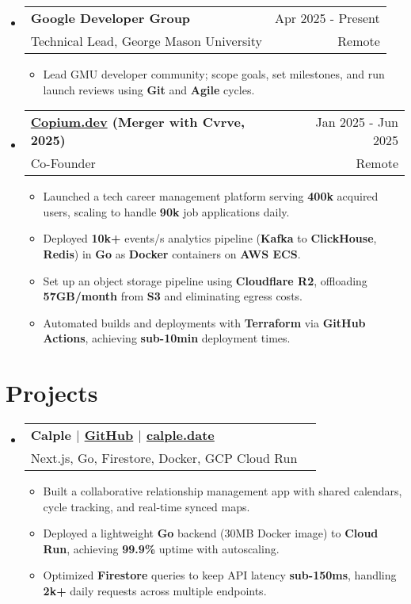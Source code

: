 \documentclass[letterpaper,11pt]{article}
\makeatletter
\newcommand{\resumeItem}[1]{
  \item{
    {#1}
  }
}
\newcommand{\resumeSubheading}[4]{
    \item
    \begin{tabular*}{0.985\textwidth}[t]{l@{\extracolsep{\fill}}r@{\hspace{-0.1in}}}
        {\textbf{#1}} & {#2} \\
        #3 &  #4 \\
    \end{tabular*}\vspace{-5pt}
}
\newcommand{\resumeSubHeadingListStart}{\begin{itemize}[leftmargin=0.00in, rightmargin=-0.2in, label={}]\vspace{3pt}}
\newcommand{\resumeSubHeadingListEnd}{\end{itemize}\vspace{-10pt}}
\newcommand{\resumeItemListStart}{\vspace{3pt}\begin{itemize}[leftmargin=0.15in, rightmargin=0.15in]}
\newcommand{\resumeItemListEnd}{\end{itemize}\vspace{-5pt}}
\makeatother
\begin{document}
\resumeSubHeadingListStart
\resumeSubheading
{Google Developer Group} {Apr 2025 - Present}
{Technical Lead, George Mason University} {Remote}
\resumeItemListStart
\resumeItem{Lead GMU developer community; scope goals, set milestones, and run launch reviews using \textbf{Git} and \textbf{Agile} cycles.}
\resumeItemListEnd
\resumeSubHeadingListEnd

\resumeSubHeadingListStart
\resumeSubheading
{\href{https://www.copium.dev}{Copium.dev} (Merger with Cvrve, 2025)} {Jan 2025 - Jun 2025}
{Co-Founder} {Remote}
\resumeItemListStart
\resumeItem{Launched a tech career management platform serving \textbf{400k} acquired users, scaling to handle \textbf{90k} job applications daily.}
\resumeItem{Deployed \textbf{10k+} events/s analytics pipeline (\textbf{Kafka} to \textbf{ClickHouse}, \textbf{Redis}) in \textbf{Go} as \textbf{Docker} containers on \textbf{AWS ECS}.}
\resumeItem{Set up an object storage pipeline using \textbf{Cloudflare R2}, offloading \textbf{57GB/month} from \textbf{S3} and eliminating egress costs.}
\resumeItem{Automated builds and deployments with \textbf{Terraform} via \textbf{GitHub Actions}, achieving \textbf{sub-10min} deployment times.}
\resumeItemListEnd
\resumeSubHeadingListEnd


\section{Projects}

\resumeSubHeadingListStart
\resumeSubheading
{\textbf{Calple} \textnormal{$|$ \href{https://github.com/juhun32/calple}{GitHub} $|$ \href{https://www.calple.date}{calple.date}}} {}
{{Next.js, Go, Firestore, Docker, GCP Cloud Run}}{}
\resumeItemListStart
\resumeItem{Built a collaborative relationship management app with shared calendars, cycle tracking, and real-time synced maps.}
\resumeItem{Deployed a lightweight \textbf{Go} backend (30MB Docker image) to \textbf{Cloud Run}, achieving \textbf{99.9\%} uptime with autoscaling.}
\resumeItem{Optimized \textbf{Firestore} queries to keep API latency \textbf{sub-150ms}, handling \textbf{2k+} daily requests across multiple endpoints.}
\resumeItemListEnd
\resumeSubHeadingListEnd

\end{document}
